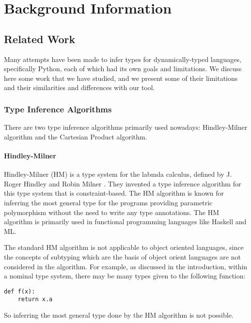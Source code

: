 
\chapter{Background Information}\label{chapter:background}

\section{Related Work}
Many attempts have been made to infer types for dynamically-typed languages, specifically Python, each of which had its own goals and limitations. We discuss here some work that we have studied, and we present some of their limitations and their similarities and differences with our tool.

\subsection{Type Inference Algorithms}
There are two type inference algorithms primarily used nowadays: Hindley-Milner algorithm and the Cartesian Product algorithm.

\subsubsection{Hindley-Milner}
Hindley-Milner (HM) is a type system for the labmda calculus, defined by J. Roger Hindley and Robin Milner \cite{hindley, milner}. They invented a type inference algorithm for this type system that is constraint-based. The HM algorithm is known for inferring the most general type for the programs providing parametric polymorphism without the need to write any type annotations. The HM algorithm is primarily used in functional programming languages like Haskell and ML.

The standard HM algorithm is not applicable to object oriented languages, since the concepts of subtyping which are the basis of object orient languages are not considered in the algorithm. For example, as discussed in the introduction, within a nominal type system, there may be many types given to the following function:
\begin{lstlisting}
def f(x):
	return x.a
\end{lstlisting}
So inferring the most general type done by the HM algorithm is not possible.

